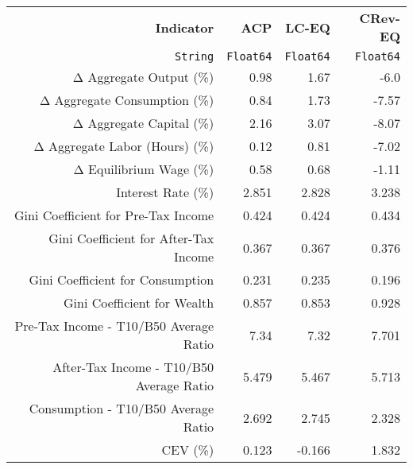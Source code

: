 \begin{tabular}{rrrr}
  \hline
  \textbf{Indicator} & \textbf{ACP} & \textbf{LC-EQ} & \textbf{CRev-EQ} \\
  \texttt{String} & \texttt{Float64} & \texttt{Float64} & \texttt{Float64} \\\hline
  Δ Aggregate Output (\%) & 0.98 & 1.67 & -6.0 \\
  Δ Aggregate Consumption (\%) & 0.84 & 1.73 & -7.57 \\
  Δ Aggregate Capital (\%) & 2.16 & 3.07 & -8.07 \\
  Δ Aggregate Labor (Hours) (\%) & 0.12 & 0.81 & -7.02 \\
  Δ Equilibrium Wage (\%) & 0.58 & 0.68 & -1.11 \\
  Interest Rate (\%) & 2.851 & 2.828 & 3.238 \\
  Gini Coefficient for Pre-Tax Income & 0.424 & 0.424 & 0.434 \\
  Gini Coefficient for After-Tax Income & 0.367 & 0.367 & 0.376 \\
  Gini Coefficient for Consumption & 0.231 & 0.235 & 0.196 \\
  Gini Coefficient for Wealth & 0.857 & 0.853 & 0.928 \\
  Pre-Tax Income - T10/B50 Average Ratio & 7.34 & 7.32 & 7.701 \\
  After-Tax Income - T10/B50 Average Ratio & 5.479 & 5.467 & 5.713 \\
  Consumption - T10/B50 Average Ratio & 2.692 & 2.745 & 2.328 \\
  CEV (\%) & 0.123 & -0.166 & 1.832 \\\hline
\end{tabular}
